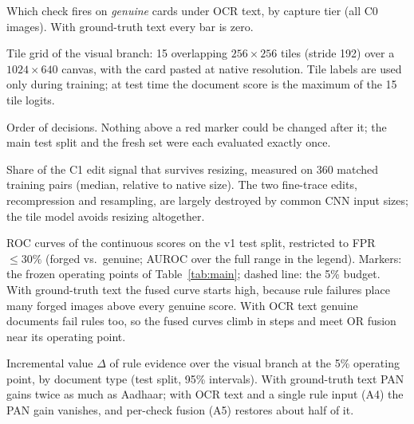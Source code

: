 \documentclass[12pt]{article}
\begin{document}
{\captionsetup{type=figure}\caption{Which check fires on \emph{genuine} cards under OCR text, by
capture tier (all \dsGenuine{} C0 images). With ground-truth text every
bar is zero.}\label{fig:perchk}}\par\medskip
{\captionsetup{type=figure}\caption{Tile grid of the visual branch: 15 overlapping $256{\times}256$
tiles (stride 192) over a $1024{\times}640$ canvas, with the card pasted
at native resolution. Tile labels are used only during training; at test
time the document score is the maximum of the 15 tile logits.}\label{fig:tiles}}\par\medskip
{\captionsetup{type=figure}\caption{Order of decisions. Nothing above a red marker could be
changed after it; the main test split and the fresh set were each
evaluated exactly once.}\label{fig:protocol}}\par\medskip
{\captionsetup{type=figure}\caption{Share of the C1 edit signal that survives resizing, measured
on 360 matched training pairs (median, relative to native size). The
two fine-trace edits, recompression and resampling, are largely
destroyed by common CNN input sizes; the tile model avoids resizing
altogether.}\label{fig:survival}}\par\medskip
{\captionsetup{type=figure}\caption{ROC curves of the continuous scores on the v1 test split, restricted to FPR ${\le}30\%$
(forged vs.\ genuine; AUROC over the full range in the legend). Markers: the frozen operating points
of Table~\ref{tab:main}; dashed line: the 5\% budget. With ground-truth text the fused curve starts
high, because rule failures place many forged images above every genuine score. With OCR text genuine
documents fail rules too, so the fused curves climb in steps and meet OR fusion near its operating
point.}\label{fig:roc}}\par\medskip
{\captionsetup{type=figure}\caption{Incremental value $\Delta$ of rule evidence over the visual branch at the 5\% operating
point, by document type (test split, 95\% intervals). With ground-truth text PAN gains twice as much
as Aadhaar; with OCR text and a single rule input (A4) the PAN gain vanishes, and per-check fusion
(A5) restores about half of it.}\label{fig:delta}}\par\medskip

\ifdefined\withfigures

\fi
\end{document}

